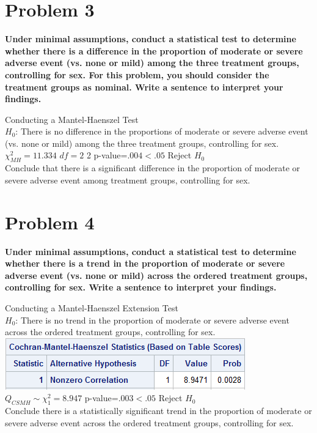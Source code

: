 \documentclass{article}
\begin{document}
\begin{flushleft}
\section*{Problem 3}
\textbf{Under minimal assumptions, conduct a statistical test to determine whether there is a difference in
the proportion of moderate or severe adverse event (vs. none or mild) among the three treatment
groups, controlling for sex. For this problem, you should consider the treatment groups as nominal.
Write a sentence to interpret your findings.}\medbreak

Conducting a Mantel-Haenszel Test\\

$H_0$: There is no difference in the proportions of moderate or severe adverse event (vs. none or mild) among the three treatment
groups, controlling for sex.\\

$\chi^2_{MH}=11.334$ $df=2$ 2 p-value=$.004<.05$ Reject $H_0$\\
Conclude that there is a significant difference in the proportion of moderate or severe adverse event among treatment groups, controlling for sex.\\

\pagebreak
\section*{Problem 4}
\textbf{Under minimal assumptions, conduct a statistical test to determine whether there is a trend in the
proportion of moderate or severe adverse event (vs. none or mild) across the ordered treatment
groups, controlling for sex. Write a sentence to interpret your findings.}\medbreak

Conducting a Mantel-Haenszel Extension Test\\

$H_0$: There is no trend in the proportion of moderate or severe adverse event across the ordered treatment groups, controlling for sex.\\
\includegraphics[scale=.6]{qsmh.png}\\
$Q_{CSMH}\sim \chi^2_1=8.947$ p-value=$.003<.05$ Reject $H_0$\\
Conclude there is a statistically significant trend in the proportion of moderate or severe adverse event across the ordered treatment groups, controlling for sex.\\
\pagebreak

\end{flushleft}
\end{document}

